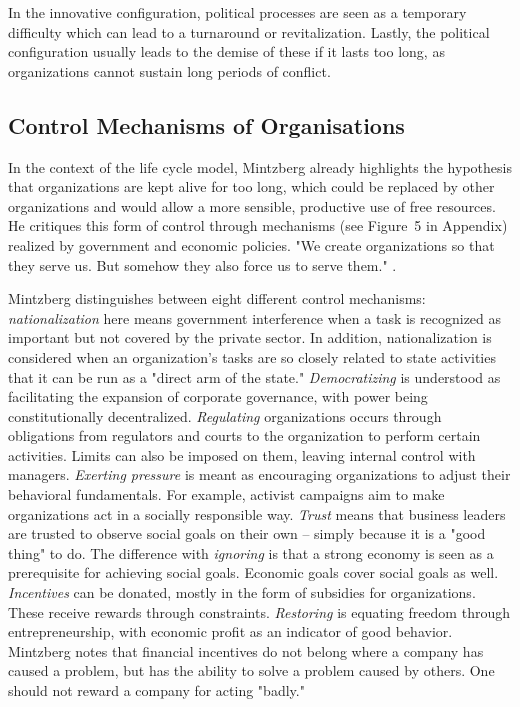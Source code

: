 \documentclass[a4paper,12pt]{article}
\begin{document}
In the innovative configuration, political processes are seen as a temporary
difficulty which can lead to a turnaround or revitalization. Lastly, the
political configuration usually leads to the demise of these if it lasts too
long, as organizations cannot sustain long periods of conflict.

\subsection{Control Mechanisms of Organisations}

In the context of the life cycle model, Mintzberg already highlights the
hypothesis that organizations are kept alive for too long, which could be
replaced by other organizations and would allow a more sensible, productive
use of free resources. He critiques this form of control through mechanisms
(see Figure~5 in Appendix) realized by government and economic policies. "We
create organizations so that they serve us. But somehow they also force us to
serve them." \cite[p. 307]{Mintzberg}.

Mintzberg distinguishes between eight different control mechanisms:
\emph{nationalization} here means government interference when a task is
recognized as important but not covered by the private sector. In addition,
nationalization is considered when an organization's tasks are so closely
related to state activities that it can be run as a "direct arm of the state."
\emph{Democratizing} is understood as facilitating the expansion of corporate
governance, with power being constitutionally decentralized. \emph{Regulating}
organizations occurs through obligations from regulators and courts to the
organization to perform certain activities. Limits can also be imposed on
them, leaving internal control with managers. \emph{Exerting pressure} is
meant as encouraging organizations to adjust their behavioral fundamentals.
For example, activist campaigns aim to make organizations act in a socially
responsible way. \emph{Trust} means that business leaders are trusted to
observe social goals on their own -- simply because it is a "good thing" to
do. The difference with \emph{ignoring} is that a strong economy is seen as a
prerequisite for achieving social goals. Economic goals cover social goals as
well.  \emph{Incentives} can be donated, mostly in the form of subsidies for
organizations. These receive rewards through constraints. \emph{Restoring} is
equating freedom through entrepreneurship, with economic profit as an
indicator of good behavior. Mintzberg notes that financial incentives do not
belong where a company has caused a problem, but has the ability to solve a
problem caused by others. One should not reward a company for acting "badly."
\end{document}
